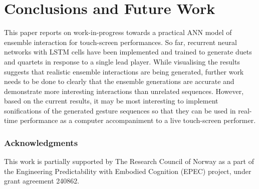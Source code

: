 \documentclass{article}
\begin{document}
\section{Conclusions and Future Work}

This paper reports on work-in-progress towards a practical ANN model
of ensemble interaction for touch-screen performances. So far,
recurrent neural networks with LSTM cells have been implemented and
trained to generate duets and quartets in response to a single lead
player. While visualising the results suggests that realistic ensemble
interactions are being generated, further work needs to be done to
clearly that the ensemble generations are accurate and demonstrate
more interesting interactions than unrelated sequences. However, based
on the current results, it may be most interesting to implement
sonifications of the generated gesture sequences so that they can be
used in real-time performance as a computer accompaniment to a live
touch-screen performer.

\subsubsection*{Acknowledgments}
This work is partially supported by The Research Council of Norway as
a part of the Engineering Predictability with Embodied Cognition
(EPEC) project, under grant agreement 240862.



\end{document}
